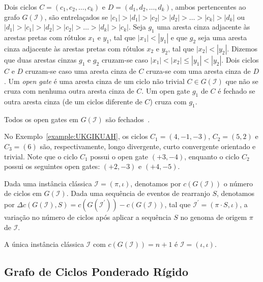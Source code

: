 Dois ciclos $C = (c_1, c_2, \ldots, c_k)$ e $D = (d_1, d_2, \ldots, d_k)$, ambos pertencentes ao grafo $G(\mathcal{I})$, são entrelaçados se $|c_1| > |d_1| > |c_2|  > |d_2| > \ldots > |c_k| > |d_k|$ ou $|d_1| > |c_1| > |d_2|  > |c_2| > \ldots > |d_k| > |c_k|$. Seja $g_1$ uma aresta cinza adjacente às arestas pretas com rótulos $x_1$ e $y_1$, tal que $|x_1| < |y_1|$ e que $g_2$ seja uma aresta cinza adjacente às arestas pretas com rótulos $x_2$ e $y_2$, tal que $|x_2| < |y_2|$. Dizemos que duas arestas cinzas $g_1$ e $g_2$ cruzam-se caso $|x_1| < |x_2| \le |y_1| < |y_2|$. Dois ciclos $C$ e $D$ cruzam-se caso uma aresta cinza de $C$ cruza-se com uma aresta cinza de $D$. Um \emph{open gate} é uma aresta cinza de um ciclo não trivial $C \in G(\mathcal{I})$ que não se cruza com nenhuma outra aresta cinza de $C$. Um open gate $g_1$ de $C$ é fechado se outra aresta cinza (de um ciclos diferente de $C$) cruza com $g_1$.

\begin{remark}\label{remark:JBJWNCKF}
Todos os open gates em $G(\mathcal{I})$ são fechados~\cite{1996-bafna-pevzner}.
\end{remark}

No Exemplo~\ref{example:UKGIKUAH}, os ciclos $C_1=(4,-1,-3)$, $C_2 = (5,2)$ e $C_3 = (6)$ são, respectivamente, longo divergente, curto convergente orientado e trivial. Note que o ciclo $C_1$ possui o open gate $({+3},{-4})$, enquanto o ciclo $C_2$ possui os seguintes open gates: $({+2},{-3})$ e $({+4},{-5})$.

Dada uma instância clássica $\mathcal{I} = (\pi,\iota)$, denotamos por $c(G(\mathcal{I}))$ o número de ciclos em $G(\mathcal{I})$. Dada uma sequência de eventos de rearranjo $S$, denotamos por $\Delta c(G(\mathcal{I}), S) = c(G(\mathcal{I^{\prime}})) - c(G(\mathcal{I}))$, tal que $\mathcal{I^{\prime}} = (\pi \cdot S,\iota)$, a variação no número de ciclos após aplicar a sequência $S$ no genoma de origem $\pi$ de $\mathcal{I}$.

\begin{remark}\label{remark:OYRVGHTB}
  A única instância clássica $\mathcal{I}$ com $c(G(\mathcal{I})) = n + 1$ é $\mathcal{I} = (\iota,\iota)$.
\end{remark}

\subsection{Grafo de Ciclos Ponderado Rígido}

